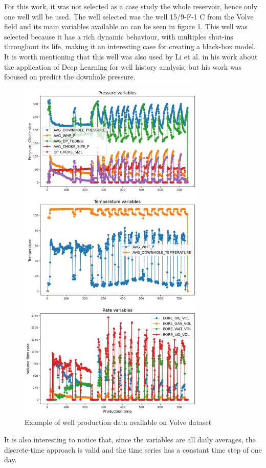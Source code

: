 \documentclass[conference]{IEEEtran}
\begin{document}
For this work, it was not selected as a case study the whole reservoir, hence only one well 
will be used. The well selected was the well 15/9-F-1 C from the Volve field and its main 
variables available on can be seen in figure \ref{example_well}. This well was selected 
because it has a rich dynamic behaviour, with multiples shut-ins throughout its life, making 
it an interesting case for creating a black-box model. It is worth mentioning that this well 
was also used by Li et al. \cite{Li2019} in his work about the application of Deep Learning 
for well history analysis, but his work was focused on predict the downhole pressure.

\begin{figure}[htbp]
\centerline{\includegraphics[width=3.5in]{data_example_2.png}}
\caption{Example of well production data available on Volve dataset}
\label{example_well}
\end{figure}

It is also interesting to notice that, since the variables are all daily averages, the 
discrete-time approach is valid and the time series has a constant time step of one day.
\end{document}
